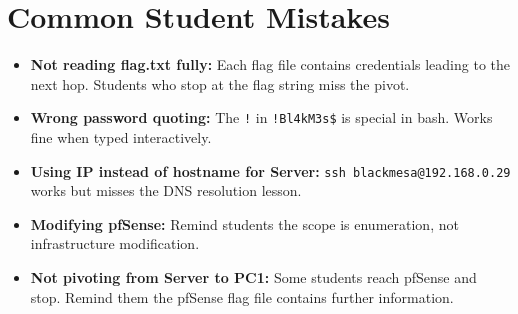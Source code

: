 \documentclass[a4paper, 12pt]{article}
\begin{document}
\section{Common Student Mistakes}

\begin{itemize}[leftmargin=1.5em]
  \item \textbf{Not reading flag.txt fully:} Each flag file contains credentials
        leading to the next hop. Students who stop at the flag string miss the pivot.
  \item \textbf{Wrong password quoting:} The \texttt{!} in \texttt{!Bl4kM3s\$}
        is special in bash. Works fine when typed interactively.
  \item \textbf{Using IP instead of hostname for Server:}
        \texttt{ssh blackmesa@192.168.0.29} works but misses the DNS resolution lesson.
  \item \textbf{Modifying pfSense:} Remind students the scope is enumeration,
        not infrastructure modification.
  \item \textbf{Not pivoting from Server to PC1:} Some students reach pfSense and
        stop. Remind them the pfSense flag file contains further information.
\end{itemize}
\end{document}
